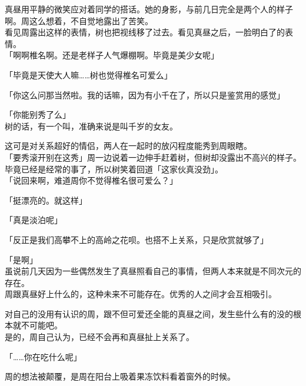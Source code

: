 真昼用平静的微笑应对着同学的搭话。她的身影，与前几日完全是两个人的样子啊。周这么想着，不自觉地露出了苦笑。\\

看见周露出这样的表情，树也把视线移了过去。看见真昼之后，一脸明白了的表情。\\

「啊啊椎名啊。还是老样子人气爆棚啊。毕竟是美少女呢」

「毕竟是天使大人嘛……树也觉得椎名可爱么」

「你这么问那当然啦。我的话嘛，因为有小千在了，所以只是鉴赏用的感觉」

「你能别秀了么」\\

树的话，有一个叫，准确来说是叫千岁的女友。

这可是对关系超好的情侣，两人在一起时的放闪程度能秀到周眼瞎。\\

「要秀滚开别在这秀」周一边说着一边伸手赶着树，但树却没露出不高兴的样子。毕竟已经是经常的事了，所以树笑着回道「这家伙真没劲」。\\

「说回来啊，难道周你不觉得椎名很可爱么？」

「挺漂亮的。就这样」

「真是淡泊呢」

「反正是我们高攀不上的高岭之花呗。也搭不上关系，只是欣赏就够了」

「是啊」\\

虽说前几天因为一些偶然发生了真昼照看自己的事情，但两人本来就是不同次元的存在。\\

周跟真昼好上什么的，这种未来不可能存在。优秀的人之间才会互相吸引。

对自己的没用有认识的周，跟不但可爱还全能的真昼之间，发生些什么有的没的根本就不可能吧。\\

是的，周自己认为，已经不会再和真昼扯上关系了。\\

\vspace{2\baselineskip}

「……你在吃什么呢」

周的想法被颠覆，是周在阳台上吸着果冻饮料看着窗外的时候。
